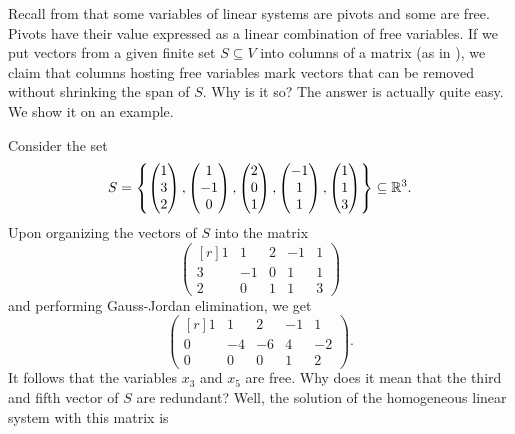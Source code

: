 Recall from  that
some variables of linear systems are pivots and some are free. Pivots have their
value expressed as a linear combination of free variables. If we put vectors
from a given finite set $S \subseteq V$ into columns of a matrix (as in
), we claim that columns hosting free
variables mark vectors that can be removed without shrinking the span of $S$.
Why is it so? The answer is actually quite easy. We show it on an example.

Consider the set
\[
 S = \left\{ 
  \begin{pmatrix}
   1\\
   3\\
   2
  \end{pmatrix},
  \begin{pmatrix}
   1\\
   -1\\
   0
  \end{pmatrix},
  \begin{pmatrix}
   2\\
   0\\
   1
  \end{pmatrix},
  \begin{pmatrix}
   -1\\
   1\\
   1
  \end{pmatrix},
  \begin{pmatrix}
   1\\
   1\\
   3
  \end{pmatrix}
 \right\} \subseteq \mathbb{R}^3.
\]
Upon organizing the vectors of $S$ into the matrix
\[
 \left( 
  \begin{matrix*}[r]
   1 & 1 & 2 & -1 & 1\\
   3 & -1 & 0 & 1 & 1\\
   2 & 0 & 1 & 1 & 3
  \end{matrix*}
 \right)
\]
and performing Gauss-Jordan elimination, we get
\[
 \left( 
  \begin{matrix*}[r]
   1 & 1 & 2 & -1 & 1\\
   0 & -4 & -6 & 4 & -2\\
   0 & 0 & 0 & 1 & 2
  \end{matrix*}
 \right).
\]
It follows that the variables $x_3$ and $x_5$ are free. Why does it mean that
the third and fifth vector of $S$ are redundant? Well, the solution of the
homogeneous linear system with this matrix is
